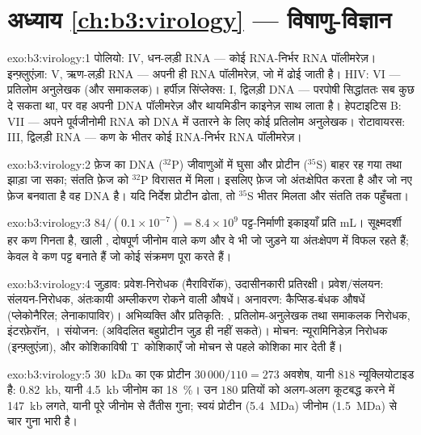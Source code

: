 \section*{अध्याय \ref{ch:b3:virology} --- विषाणु-विज्ञान}

\begin{solution}{exo:b3:virology:1}
पोलियो: IV, धन-लड़ी RNA --- कोई RNA-निर्भर RNA पॉलीमरेज़।
इन्फ़्लुएंज़ा: V, ऋण-लड़ी RNA --- अपनी ही RNA पॉलीमरेज़, जो  में
ढोई जाती है। HIV: VI --- प्रतिलोम अनुलेखक (और समाकलक)। हर्पीज़
सिंप्लेक्स: I, द्विलड़ी DNA --- परपोषी सिद्धांततः सब कुछ दे सकता था, पर
वह अपनी DNA पॉलीमरेज़ और थायमिडीन काइनेज़ साथ लाता है।
हेपटाइटिस B: VII --- अपने पूर्वजीनोमी RNA को DNA में उतारने के लिए कोई
प्रतिलोम अनुलेखक। रोटावायरस: III, द्विलड़ी RNA --- कण के भीतर कोई
RNA-निर्भर RNA पॉलीमरेज़।
\end{solution}

\begin{solution}{exo:b3:virology:2}
फ़ेज का DNA ($^{32}$P) जीवाणुओं में घुसा और प्रोटीन
($^{35}$S) बाहर रह गया तथा झाड़ा जा सका; संतति फ़ेज को
$^{32}$P विरासत में मिला। इसलिए फ़ेज जो अंतःक्षेपित करता है और जो नए
फ़ेज बनवाता है वह DNA है। यदि निर्देश प्रोटीन ढोता, तो
$^{35}$S भीतर मिलता और संतति तक पहुँचता।
\end{solution}

\begin{solution}{exo:b3:virology:3}
$84/(0.1\times 10^{-7}) = 8.4\times 10^{9}$ पट्ट-निर्माणी इकाइयाँ प्रति mL।
सूक्ष्मदर्शी हर कण गिनता है, खाली , दोषपूर्ण जीनोम वाले कण और
वे भी जो जुड़ने या अंतःक्षेपण में विफल रहते हैं; केवल वे कण पट्ट बनाते
हैं जो कोई संक्रमण पूरा करते हैं।
\end{solution}

\begin{solution}{exo:b3:virology:4}
जुड़ाव: प्रवेश-निरोधक (मैराविरॉक), उदासीनकारी प्रतिरक्षी।
प्रवेश/संलयन: संलयन-निरोधक, अंतःकायी अम्लीकरण रोकने वाली औषधें।
अनावरण: कैप्सिड-बंधक औषधें (प्लेकोनैरिल; लेनाकापाविर)। अभिव्यक्ति
और प्रतिकृति: , प्रतिलोम-अनुलेखक तथा
समाकलक निरोधक, इंटरफ़ेरॉन, । संयोजन:  (अविदलित बहुप्रोटीन जुड़ ही नहीं सकते)। मोचन:
न्यूरामिनिडेज़ निरोधक (इन्फ़्लुएंज़ा), और कोशिकाविषी T~कोशिकाएँ जो
मोचन से पहले कोशिका मार देती हैं।
\end{solution}

\begin{solution}{exo:b3:virology:5}
\qty{30}{kDa} का एक प्रोटीन $30\,000/110 = 273$ अवशेष, यानी $818$
न्यूक्लियोटाइड है: \qty{0.82}{kb}, यानी \qty{4.5}{kb} जीनोम का \qty{18}{\%}।
उन $180$ प्रतियों को अलग-अलग कूटबद्ध करने में \qty{147}{kb} लगते,
यानी पूरे जीनोम से तैंतीस गुना; स्वयं  प्रोटीन
(\qty{5.4}{MDa}) जीनोम (\qty{1.5}{MDa}) से चार गुना भारी है।
\end{solution}

